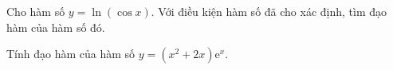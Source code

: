 \begin{ex}%
	Cho hàm số $y=\ln (\cos x)$. Với điều kiện hàm  số đã cho xác định, tìm đạo hàm của hàm số đó.
\end{ex}

\begin{ex}%
	Tính đạo  hàm của hàm số $y=\left(x^2+2 x\right) \mathrm{e}^x$.
\end{ex}

